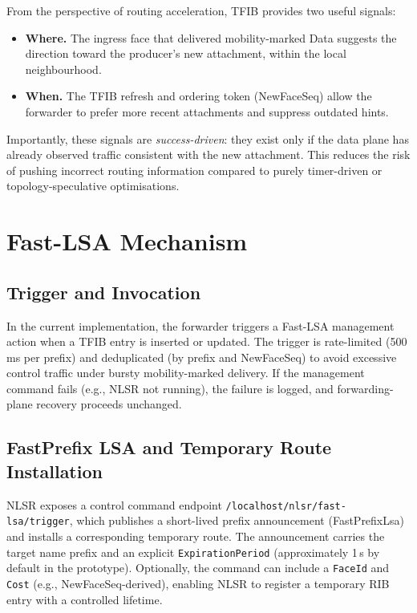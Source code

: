 From the perspective of routing acceleration, TFIB provides two useful signals:

\begin{itemize}
  \item \textbf{Where.} The ingress face that delivered mobility-marked Data suggests the direction toward the producer’s new attachment, within the local neighbourhood.
  \item \textbf{When.} The TFIB refresh and ordering token (NewFaceSeq) allow the forwarder to prefer more recent attachments and suppress outdated hints.
\end{itemize}

Importantly, these signals are \emph{success-driven}: they exist only if the data plane has already observed traffic consistent with the new attachment. This reduces the risk of pushing incorrect routing information compared to purely timer-driven or topology-speculative optimisations.


\section{Fast-LSA Mechanism}
\label{sec:routing_acceleration:fast-lsa_mechanism}

\subsection{Trigger and Invocation}
In the current implementation, the forwarder triggers a Fast-LSA management action when a TFIB entry is inserted or updated. The trigger is rate-limited (500\,ms per prefix) and deduplicated (by prefix and NewFaceSeq) to avoid excessive control traffic under bursty mobility-marked delivery. If the management command fails (e.g., NLSR not running), the failure is logged, and forwarding-plane recovery proceeds unchanged.

\subsection{FastPrefix LSA and Temporary Route Installation}
NLSR exposes a control command endpoint \texttt{/localhost/nlsr/fast-lsa/trigger}, which publishes a short-lived prefix announcement (FastPrefixLsa) and installs a corresponding temporary route. The announcement carries the target name prefix and an explicit \texttt{ExpirationPeriod} (approximately 1\,s by default in the prototype). Optionally, the command can include a \texttt{FaceId} and \texttt{Cost} (e.g., NewFaceSeq-derived), enabling NLSR to register a temporary RIB entry with a controlled lifetime.

